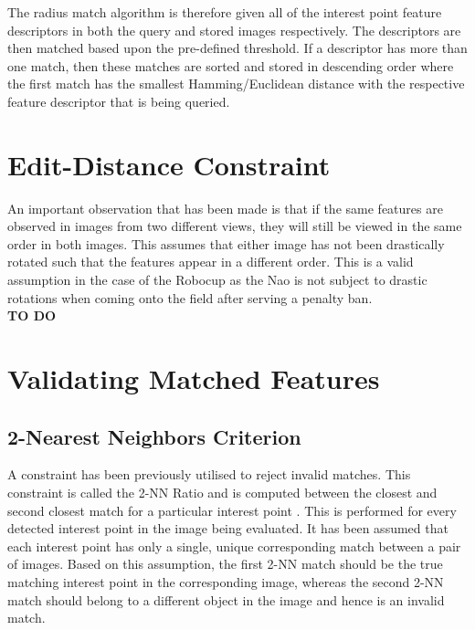 \documentclass{report}
\begin{document}
The radius match algorithm is therefore given all of the interest point feature descriptors in both the query and stored images respectively. The descriptors are then matched based upon the pre-defined threshold. If a descriptor has more than one match, then these matches are sorted and stored in descending order where the first match has the smallest Hamming/Euclidean distance with the respective feature descriptor that is being queried.\\ 

\section{Edit-Distance Constraint}
\label{sec:editDistance}
An important observation that has been made is that if the same features are observed in images from two different views, they will still be viewed in the same order in both images. This assumes that either image has not been drastically rotated such that the features appear in a different order. This is a valid assumption in the case of the Robocup as the Nao is not subject to drastic rotations when coming onto the field after serving a penalty ban.\\

\textbf{TO DO}
%


\section{Validating Matched Features}
\label{sec:validation}

\subsection{2-Nearest Neighbors Criterion}
\label{sec:knnMatching}
A constraint has been previously utilised to reject invalid matches. This constraint is called the 2-NN Ratio and is computed between the closest and second closest match for a particular interest point \cite{Lowe2004}. This is performed for every detected interest point in the image being evaluated. It has been assumed that each interest point has only a single, unique corresponding match between a pair of images. Based on this assumption, the first 2-NN match should be the true matching interest point in the corresponding image, whereas the second 2-NN match should belong to a different object in the image and hence is an invalid match.\\
\end{document}
